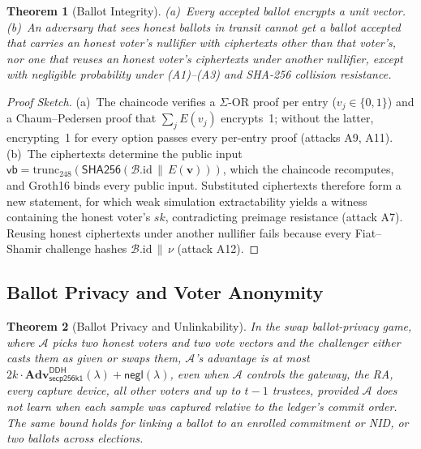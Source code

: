 \documentclass[10pt,letterpaper,journal]{IEEEtran}
\newtheorem{theorem}{Theorem}[section]
\begin{document}
\begin{theorem}[Ballot Integrity]
\label{thm:integrity}
(a)~Every accepted ballot encrypts a unit vector. (b)~An adversary that sees honest ballots in transit cannot get a ballot accepted that carries an honest voter's nullifier with ciphertexts other than that voter's, nor one that reuses an honest voter's ciphertexts under another nullifier, except with negligible probability under (A1)--(A3) and SHA-256 collision resistance.
\end{theorem}

\begin{proof}[Proof Sketch]
(a)~The chaincode verifies a $\Sigma$-OR proof per entry ($v_j \in \{0,1\}$) and a Chaum--Pedersen proof that $\sum_j E(v_j)$ encrypts~1; without the latter, encrypting~1 for every option passes every per-entry proof (attacks A9, A11). (b)~The ciphertexts determine the public input $\mathsf{vb} = \mathrm{trunc}_{248}(\mathsf{SHA256}(\mathcal{B}.\mathrm{id} \,\|\, E(\mathbf{v})))$, which the chaincode recomputes, and Groth16 binds every public input. Substituted ciphertexts therefore form a new statement, for which weak simulation extractability yields a witness containing the honest voter's $sk$, contradicting preimage resistance (attack A7). Reusing honest ciphertexts under another nullifier fails because every Fiat--Shamir challenge hashes $\mathcal{B}.\mathrm{id} \,\|\, \nu$ (attack A12).
\end{proof}

\subsection{Ballot Privacy and Voter Anonymity}
\label{sec:anonymity}\label{sec:secrecy}

\begin{theorem}[Ballot Privacy and Unlinkability]
\label{thm:anonymity}\label{thm:secrecy}
In the swap ballot-privacy game, where $\mathcal{A}$ picks two honest voters and two vote vectors and the challenger either casts them as given or swaps them, $\mathcal{A}$'s advantage is at most $2k \cdot \mathbf{Adv}^{\mathsf{DDH}}_{\mathsf{secp256k1}}(\lambda) + \mathsf{negl}(\lambda)$, even when $\mathcal{A}$ controls the gateway, the RA, every capture device, all other voters and up to $t-1$ trustees, provided $\mathcal{A}$ does not learn when each sample was captured relative to the ledger's commit order. The same bound holds for linking a ballot to an enrolled commitment or NID, or two ballots across elections.
\end{theorem}
\end{document}
